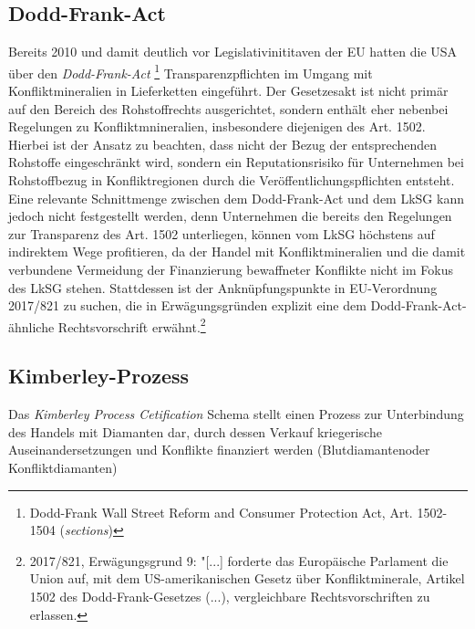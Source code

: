 \documentclass[12pt,a4paper,oneside]{book} %
\begin{document}
\subsection{Dodd-Frank-Act}
Bereits 2010 und damit deutlich vor Legislativinititaven der EU hatten die USA über den \textit{Dodd-Frank-Act} \footnote{Dodd-Frank Wall Street Reform and Consumer Protection Act, Art. 1502-1504 (\textit{sections})} Transparenzpflichten im Umgang mit Konfliktmineralien in Lieferketten eingeführt. Der Gesetzesakt ist nicht primär auf den Bereich des Rohstoffrechts ausgerichtet, sondern enthält eher nebenbei Regelungen zu Konfliktmnineralien, insbesondere diejenigen des Art. 1502.  Hierbei ist der Ansatz zu beachten, dass nicht der Bezug der entsprechenden Rohstoffe eingeschränkt wird, sondern ein Reputationsrisiko für Unternehmen bei Rohstoffbezug in Konfliktregionen durch die Veröffentlichungspflichten entsteht.\autocite[Rn. 415]{ruttloff_lieferkettensorgfaltspflichtengesetz_2022} Eine relevante Schnittmenge zwischen dem Dodd-Frank-Act und dem LkSG kann jedoch nicht festgestellt werden, denn Unternehmen die bereits den Regelungen zur Transparenz des Art. 1502 unterliegen, können vom LkSG höchstens auf indirektem Wege profitieren, da der Handel mit Konfliktmineralien und die damit verbundene Vermeidung der Finanzierung bewaffneter Konflikte nicht im Fokus des LkSG stehen.\autocite[Rn 423]{ruttloff_lieferkettensorgfaltspflichtengesetz_2022} Stattdessen ist der Anknüpfungspunkte in EU-Verordnung 2017/821 zu suchen, die in Erwägungsgründen explizit eine dem Dodd-Frank-Act-ähnliche Rechtsvorschrift erwähnt.\footnote{2017/821, Erwägungsgrund 9: "[...] forderte das Europäische Parlament die Union auf, mit dem US-amerikanischen Gesetz über Konfliktminerale, Artikel 1502 des Dodd-Frank-Gesetzes (...), vergleichbare Rechtsvorschriften zu erlassen.} 

\subsection{Kimberley-Prozess}
Das \textit{Kimberley Process Cetification} Schema stellt einen Prozess zur Unterbindung des Handels mit Diamanten dar, durch dessen Verkauf kriegerische Auseinandersetzungen und Konflikte finanziert werden (\glqq Blutdiamanten\grqq oder Konfliktdiamanten)
\end{document}
